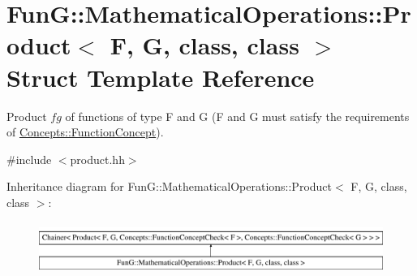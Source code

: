 \hypertarget{structFunG_1_1MathematicalOperations_1_1Product}{}\section{Fun\+G\+:\+:Mathematical\+Operations\+:\+:Product$<$ F, G, class, class $>$ Struct Template Reference}
\label{structFunG_1_1MathematicalOperations_1_1Product}


Product $fg$ of functions of type F and G (F and G must satisfy the requirements of \hyperlink{structFunG_1_1Concepts_1_1FunctionConcept}{Concepts\+::\+Function\+Concept}).  




{\ttfamily \#include $<$product.\+hh$>$}

Inheritance diagram for Fun\+G\+:\+:Mathematical\+Operations\+:\+:Product$<$ F, G, class, class $>$\+:\begin{figure}[H]
\begin{center}
\leavevmode
\includegraphics[height=1.728395cm]{structFunG_1_1MathematicalOperations_1_1Product}
\end{center}
\end{figure}
